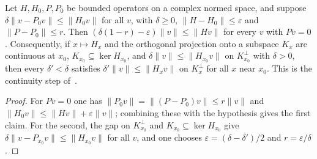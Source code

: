 \begin{lemma}
    \label{lem:kernel_gap_perturbation}
    \leanok
    Let $H,H_0,P,P_0$ be bounded operators on a complex normed space, and
    suppose $\delta\lVert v-P_0v\rVert\leq\lVert H_0v\rVert$ for all $v$, with
    $\delta\geq0$, $\lVert H-H_0\rVert\leq\varepsilon$ and
    $\lVert P-P_0\rVert\leq r$. Then
    $(\delta(1-r)-\varepsilon)\lVert v\rVert\leq\lVert Hv\rVert$ for every $v$
    with $Pv=0$. Consequently, if $x\mapsto H_x$ and the orthogonal projection
    onto a subspace $K_x$ are continuous at $x_0$, $K_{x_0}\subseteq\ker H_{x_0}$,
    and $\delta\lVert v\rVert\leq\lVert H_{x_0}v\rVert$ on $K_{x_0}^\perp$ with
    $\delta>0$, then every $\delta'<\delta$ satisfies
    $\delta'\lVert v\rVert\leq\lVert H_xv\rVert$ on $K_x^\perp$ for all $x$
    near $x_0$. This is the continuity step
    of~\cite[Appendix~A]{Schuch2011Phases}.
\end{lemma}
\begin{proof}\leanok
    For $Pv=0$ one has $\lVert P_0v\rVert=\lVert(P-P_0)v\rVert\leq r\lVert v\rVert$
    and $\lVert H_0v\rVert\leq\lVert Hv\rVert+\varepsilon\lVert v\rVert$;
    combining these with the hypothesis gives the first claim. For the second,
    the gap on $K_{x_0}^\perp$ and $K_{x_0}\subseteq\ker H_{x_0}$ give
    $\delta\lVert v-P_{x_0}v\rVert\leq\lVert H_{x_0}v\rVert$ for all $v$, and
    one chooses $\varepsilon=(\delta-\delta')/2$ and $r=\varepsilon/\delta$.
\end{proof}

